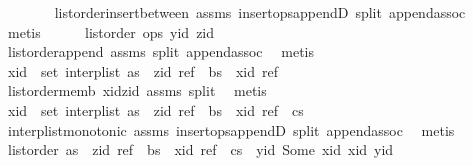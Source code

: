\begin{isabellebody}
\ \ \ \ \ \ \isamarkupfalse%
\ list{\isacharunderscore}order{\isacharunderscore}insert{\isacharunderscore}between\ assms{\isacharparenleft}{}{\isacharparenright}\ insert{\isacharunderscore}ops{\isacharunderscore}appendD\ split\ append{\isachardot}assoc\ \isamarkupfalse%
\ metis\isanewline
\ \ \ \ \isamarkupfalse%
\ {\isachardoublequoteopen}list{\isacharunderscore}order\ ops\ yid\ zid{\isachardoublequoteclose}\isanewline
\ \ \ \ \ \ \isamarkupfalse%
\ list{\isacharunderscore}order{\isacharunderscore}append\ assms{\isacharparenleft}{}{\isacharparenright}\ split\ append{\isachardot}assoc\ \isamarkupfalse%
\ metis\isanewline
\ \ \ \ \isamarkupfalse%
\ \isamarkupfalse%
\ {\isachardoublequoteopen}xid\ {\isasymin}\ set\ {\isacharparenleft}interp{\isacharunderscore}list\ {\isacharparenleft}as\ {\isacharat}\ {\isacharbrackleft}{\isacharparenleft}zid{\isacharcomma}\ ref{\isacharparenright}{\isacharbrackright}\ {\isacharat}\ bs\ {\isacharat}\ {\isacharbrackleft}{\isacharparenleft}xid{\isacharcomma}\ ref{\isacharparenright}{\isacharbrackright}{\isacharparenright}{\isacharparenright}{\isachardoublequoteclose}\isanewline
\ \ \ \ \ \ \isamarkupfalse%
\ list{\isacharunderscore}order{\isacharunderscore}memb{}\ xid{\isacharunderscore}zid\ assms{\isacharparenleft}{}{\isacharparenright}\ split\ \isamarkupfalse%
\ metis\isanewline
\ \ \ \ \isamarkupfalse%
\ {\isachardoublequoteopen}xid\ {\isasymin}\ set\ {\isacharparenleft}interp{\isacharunderscore}list\ {\isacharparenleft}as\ {\isacharat}\ {\isacharbrackleft}{\isacharparenleft}zid{\isacharcomma}\ ref{\isacharparenright}{\isacharbrackright}\ {\isacharat}\ bs\ {\isacharat}\ {\isacharbrackleft}{\isacharparenleft}xid{\isacharcomma}\ ref{\isacharparenright}{\isacharbrackright}\ {\isacharat}\ cs{\isacharparenright}{\isacharparenright}{\isachardoublequoteclose}\isanewline
\ \ \ \ \ \ \isamarkupfalse%
\ interp{\isacharunderscore}list{\isacharunderscore}monotonic\ assms{\isacharparenleft}{}{\isacharparenright}\ insert{\isacharunderscore}ops{\isacharunderscore}appendD\ split\ append{\isachardot}assoc\ \isamarkupfalse%
\ metis\isanewline
\ \ \ \ \isamarkupfalse%
\ {\isachardoublequoteopen}list{\isacharunderscore}order\ {\isacharparenleft}as\ {\isacharat}\ {\isacharbrackleft}{\isacharparenleft}zid{\isacharcomma}\ ref{\isacharparenright}{\isacharbrackright}\ {\isacharat}\ bs\ {\isacharat}\ {\isacharbrackleft}{\isacharparenleft}xid{\isacharcomma}\ ref{\isacharparenright}{\isacharbrackright}\ {\isacharat}\ cs\ {\isacharat}\ {\isacharbrackleft}{\isacharparenleft}yid{\isacharcomma}\ Some\ xid{\isacharparenright}{\isacharbrackright}{\isacharparenright}\ xid\ yid{\isachardoublequoteclose}\isanewline

\end{isabellebody}
